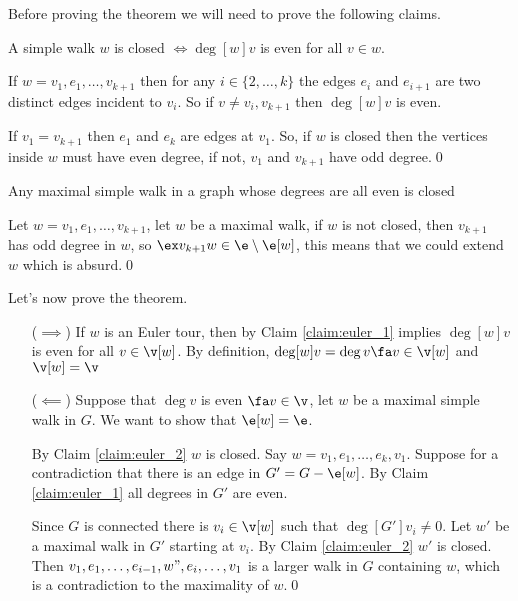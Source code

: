 \begin{prf}
    Before proving the theorem we will need to prove the following claims.
    \begin{claim}
    \label{claim:euler_1}
        A simple walk $w$ is closed $\iff \deg[w]{v}$ is even for all $v \in w$.
    \end{claim}
    \begin{prf}
        If $w = v_1, e_1, \dots, v_{k + 1}$ then for any $i \in \{2, \dots, k\}$ the edges $e_i$ and $e_{i + 1}$ are two distinct edges incident to $v_i$. So if $v \neq v_i, v_{k + 1}$ then $\deg[w]{v}$ is even.

        If $v_1 = v_{k + 1}$ then $e_1$ and $e_k$ are edges at $v_1$. So, if $w$ is closed then the vertices inside $w$ must have even degree, if not, $v_1$ and $v_{k + 1}$ have odd degree.\qed
    \end{prf}
    \begin{claim}
    \label{claim:euler_2}
        Any maximal simple walk in a graph whose degrees are all even is closed
    \end{claim}
    \begin{prf}
        Let $w = v_1, e_1, \dots, v_{k + 1}$, let $w$ be a maximal walk, if $w$ is not closed, then $v_{k + 1}$ has odd degree in $w$, so $\ex v_{k + 1}w \in \e \setminus \e[w]$, this means that we could extend $w$ which is absurd.\qed
    \end{prf}
    Let's now prove the theorem.

    \begin{enumerate}
        \item[($\implies$)] If $w$ is an Euler tour, then by Claim \ref{claim:euler_1} implies $\deg[w]{v}$ is even for all $v \in \v[w]$. By definition, $\deg[w]{v} = \deg{v} \fa v \in \v[w]$ and $\v[w] = \v$
        \item[($\impliedby$)] Suppose that $\deg{v}$ is even $\fa v \in \v$, let $w$ be a maximal simple walk in $G$. We want to show that $\e[w] = \e$.
        
        By Claim \ref{claim:euler_2} $w$ is closed. Say $w = v_1, e_1, \dots, e_k, v_1$. Suppose for a contradiction that there is an edge in $G' = G - \e[w]$. By Claim \ref{claim:euler_1} all degrees in $G'$ are even.

        Since $G$ is connected there is $v_i \in \v[w]$ such that $\deg[G']{v_i} \neq 0$. Let $w'$ be a maximal walk in $G'$ starting at $v_i$. By Claim \ref{claim:euler_2} $w'$ is closed. Then $v_1, e_1, \dots, e_{i - 1}, w", e_i, \dots, v_1$ is a larger walk in $G$ containing $w$, which is a contradiction to the maximality of $w$.\qed
    \end{enumerate}
\end{prf}
